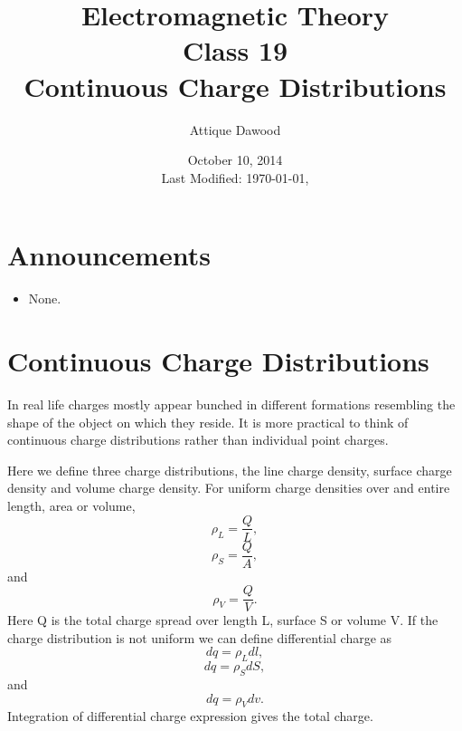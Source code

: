 \documentclass[12pt,a4paper]{article}
\title{Electromagnetic Theory\\Class 19\\Continuous Charge Distributions}
\author{Attique Dawood}
\date{October 10, 2014\\[0.2cm] Last Modified: \today, \currenttime}
\begin{document}
\maketitle
\section{Announcements}
\begin{itemize}
\item None.
\end{itemize}
\section{Continuous Charge Distributions}
In real life charges mostly appear bunched in different formations resembling the shape of the object on which they reside. It is more practical to think of continuous charge distributions rather than individual point charges.

Here we define three charge distributions, the line charge density, surface charge density and volume charge density. For uniform charge densities over and entire length, area or volume,
\begin{equation}
\rho_L=\dfrac{Q}{L},
\end{equation}
\begin{equation}
\rho_S=\dfrac{Q}{A},
\end{equation}
and
\begin{equation}
\rho_V=\dfrac{Q}{V}.
\end{equation}
Here Q is the total charge spread over length L, surface S or volume V. If the charge distribution is not uniform we can define differential charge as
\begin{equation}
dq=\rho_Ldl,
\end{equation}
\begin{equation}
dq=\rho_SdS,
\end{equation}
and
\begin{equation}
dq=\rho_Vdv.
\end{equation}
Integration of differential charge expression gives the total charge.
\end{document}
